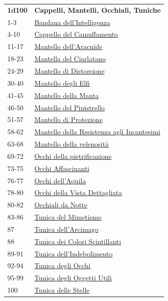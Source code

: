 \begin{multicols}{2}
{{\small\begin{tabularx}{0.45\textwidth}{lX}
\textbf{1d100} & \textbf{Cappelli, Mantelli, Occhiali, Tuniche}\\
1-3 & \hyperlink{Bandanadell'Intelligenza}{Bandana dell'Intelligenza}\\
4-10 & \hyperlink{CappellodelCamuffamento}{Cappello del Camuffamento}\\
11-17 & \hyperlink{Mantellodell'Aracnide}{Mantello dell'Aracnide}\\
18-23 & \hyperlink{MantelladelCiarlatano}{Mantella del Ciarlatano}\\
24-29 & \hyperlink{MantellodiDistorsione}{Mantello di Distorsione}\\
30-40 & \hyperlink{MantellodegliElfi}{Mantello degli Elfi}\\
41-45 & \hyperlink{MantellodellaManta}{Mantello della Manta}\\
46-50 & \hyperlink{MantellodelPipistrello}{Mantello del Pipistrello}\\
51-57 & \hyperlink{MantellodiProtezione}{Mantello di Protezione}\\
58-62 & \hyperlink{MantellodellaResistenzaagliIncantesimi}{Mantello della Resistenza agli Incantesimi}\\
63-68 & \hyperlink{Mantellodellavelenosità}{Mantello della velenosità}\\
69-72 & \hyperlink{Occhidellapietrificazione}{Occhi della pietrificazione}\\
73-75 & \hyperlink{OcchiAffascinanti}{Occhi Affascinanti}\\
76-77 & \hyperlink{Occhidell'Aquila}{Occhi dell'Aquila}\\
78-80 & \hyperlink{OcchidellaVistaDettagliata}{Occhi della Vista Dettagliata}\\
80-82 & \hyperlink{OcchialidaNotte}{Occhiali da Notte}\\
83-86 & \hyperlink{TunicadelMimetismo}{Tunica del Mimetismo}\\
87 & \hyperlink{Tunicadell'Arcimago}{Tunica dell'Arcimago}\\
88 & \hyperlink{TunicadeiColoriScintillanti}{Tunica dei Colori Scintillanti}\\
89-91 & \hyperlink{Tunicadell'Indebolimento}{Tunica dell'Indebolimento}\\
92-94 & \hyperlink{TunicadegliOcchi}{Tunica degli Occhi}\\
95-99 & \hyperlink{TunicadegliOggettiUtili}{Tunica degli Oggetti Utili}\\
100 & \hyperlink{TunicadelleStelle}{Tunica delle Stelle}
\end{tabularx}}


}
\end{multicols}
